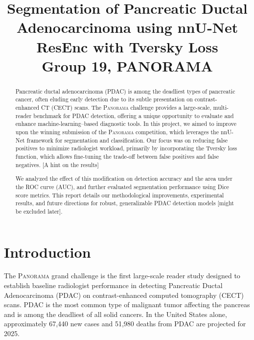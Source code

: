 \documentclass[conference]{IEEEtran}
\begin{document}
\title{Segmentation of Pancreatic Ductal Adenocarcinoma using nnU-Net ResEnc with Tversky Loss \\ {\Large Group 19, PANORAMA}}

\author{
\and
{}
\and
{}
\and
{}
}

\maketitle

\begin{abstract}
Pancreatic ductal adenocarcinoma (PDAC) is among the deadliest types of pancreatic cancer, often eluding early detection due to its subtle presentation on contrast-enhanced CT (CECT) scans. The \textsc{Panorama} challenge provides a large-scale, multi-reader benchmark for PDAC detection, offering a unique opportunity to evaluate and enhance machine-learning–based diagnostic tools. In this project, we aimed to improve upon the winning submission of the \textsc{Panorama} competition, which leverages the nnU-Net framework for segmentation and classification. Our focus was on reducing false positives to minimize radiologist workload, primarily by incorporating the Tversky loss function, which allows fine-tuning the trade-off between false positives and false negatives. [A hint on the results]


We analyzed the effect of this modification on detection accuracy and the area under the ROC curve (AUC), and further evaluated segmentation performance using Dice score metrics. This report details our methodological improvements, experimental results, and future directions for robust, generalizable PDAC detection models [might be excluded later].

\end{abstract}

\section{Introduction}
The \textsc{Panorama} grand challenge \cite{b5} is the first large-scale reader study designed to establish baseline radiologist performance in detecting Pancreatic Ductal Adenocarcinoma (PDAC) on contrast-enhanced computed tomography (CECT) scans. PDAC is the most common type of malignant tumor affecting the pancreas and is among the deadliest of all solid cancers. In the United States alone, approximately 67,440 new cases and 51,980 deaths from PDAC are projected for 2025\cite{b2}.
\end{document}
